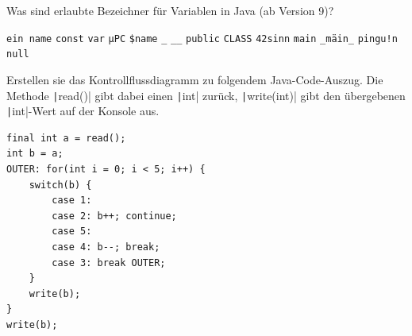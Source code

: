 \documentclass[11pt]{exam} %
\newcommand{\code}[1]{\texttt|#1|}
\newcommand{\fillinline}[1]{\ifprintanswers\fillin[\code{#1}][3cm]\fi\xrfill[-1pt]{0.2mm}}
\begin{document}
\begin{questions}
\filbreak
\question Was sind erlaubte Bezeichner für Variablen in Java (ab Version 9)?
\begin{checkboxes}
\choice \texttt{ein name}
\choice \texttt{const}
\CorrectChoice \texttt{var}
\CorrectChoice \texttt{µPC}
\CorrectChoice \texttt{\$name}
\choice \texttt{\_}
\CorrectChoice \texttt{\_\_}
\choice \texttt{public}
\CorrectChoice \texttt{CLASS}
\choice \texttt{42sinn}
\CorrectChoice \texttt{main}
\CorrectChoice \texttt{\_mäin\_}
\choice \texttt{pingu!n}
\choice \texttt{null}
\end{checkboxes}
\filbreak
\question Erstellen sie das Kontrollflussdiagramm zu folgendem Java-Code-Auszug. Die Methode \code{read()} gibt dabei einen \code{int} zurück, \code{write(int)} gibt den übergebenen \code{int}-Wert auf der Konsole aus.
\begin{verbatim}
final int a = read();
int b = a;
OUTER: for(int i = 0; i < 5; i++) {
	switch(b) {
		case 1:
		case 2: b++; continue;
		case 5:
		case 4: b--; break;
		case 3: break OUTER;
	}
	write(b);
}
write(b);
\end{verbatim}
\begin{solution}\par\nobreak

\end{solution}
\end{questions}
\end{document}
